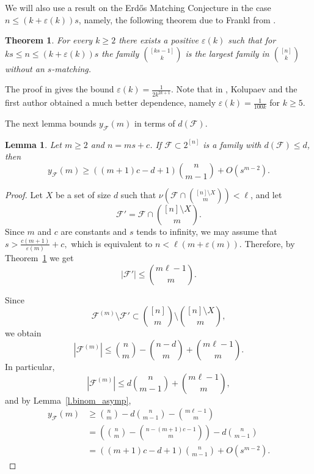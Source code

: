 \documentclass[12pt,a4paper]{article}
\newtheorem{theorem}{Theorem}
\newtheorem{lemma}{Lemma}
\begin{document}
We will also use a result on the Erd\H{o}s Matching Conjecture in the case $n \leq (k + \varepsilon(k))s$, namely, the following theorem due to Frankl from \cite{Frankl_perfect_EMC}.

\begin{theorem} \label{t.frankl_EMC}
    For every $k \geq 2$ there exists a positive $\varepsilon(k)$ such that for $ks \leq n \leq (k + \varepsilon(k))s$ the family ${[ks-1] \choose k}$ is the largest family in ${[n] \choose k}$ without an $s$-matching.
\end{theorem}

The proof in \cite{Frankl_perfect_EMC} gives the bound $\varepsilon(k) = \frac{1}{2k^{2k+1}}$. Note that in \cite{KoKu},  Kolupaev and the first author obtained a much better dependence, namely $\varepsilon(k) = \frac{1}{100k}$ for $k \geq 5$.

The next lemma bounds $y_{\mathcal{F}}(m)$ in terms of $d(\mathcal{F})$.

\begin{lemma} \label{l.d_to_ym}
    Let $m \geq 2$ and $n = ms+c$. If $\mathcal{F} \subset 2^{[n]}$ is a family with $d(\mathcal{F}) \leq d$, then
    \[
    y_{\mathcal{F}}(m) \geq ((m+1)c-d+1){n \choose m - 1} + O(s^{m - 2}).
    \]
\end{lemma}

\begin{proof}
    Let $X$ be a set of size $d$ such that $\nu(\mathcal{F} \cap {[n] \setminus X \choose m}) < \ell$, and let
    \[
    \mathcal{F'} = \mathcal{F} \cap {[n] \setminus X \choose m}.
    \]
    Since $m$ and $c$ are constants and $s$ tends to infinity, we may assume that
    $
    s > \frac{c(m+1)}{\varepsilon(m)} + c,
    $
    which is equivalent to $n < \ell(m + \varepsilon(m))$. Therefore, by Theorem~\ref{t.frankl_EMC} we get
    \[
    |\mathcal{F'}| \leq {m\ell - 1 \choose m}.
    \]

    Since
    \[
    \mathcal{F}^{(m)} \setminus \mathcal{F'} \subset {[n] \choose m} \setminus {[n] \setminus X \choose m},
    \]
    we obtain
    \[
    |\mathcal{F}^{(m)}| \leq {n \choose m} - {n - d \choose m} + {m\ell - 1 \choose m}.
    \]
    In particular,
    \[
    |\mathcal{F}^{(m)}| \leq d{n \choose m - 1} + {m\ell - 1 \choose m},
    \]
    and by Lemma~\ref{l.binom_asymp},
    \begin{align*}
        y_{\mathcal{F}}(m)
        &\geq {n \choose m} - d{n \choose m - 1} - {m\ell - 1 \choose m} \\
        &= \left({n \choose m} - {n - (m+1)c - 1 \choose m}\right) - d{n \choose m - 1} \\
        &= ((m+1)c-d+1){n \choose m - 1} + O(s^{m - 2}).
    \end{align*}
\end{proof}
\end{document}
